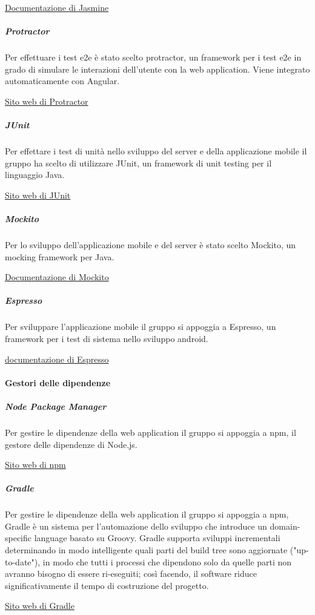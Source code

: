 \documentclass[../../norme-di-progetto.tex]{subfiles}
\begin{document}
\href{https://jasmine.github.io/}{Documentazione di Jasmine}

\subparagraph{Protractor}%
\label{subp:protractor}
Per effettuare i test e2e è stato scelto protractor, un framework per i test e2e in grado di simulare le interazioni dell'utente con la web application.
Viene integrato automaticamente con Angular.

\href{https://www.protractortest.org/}{Sito web di Protractor}

\subparagraph{JUnit}%
\label{subp:junit}
Per effettare i test di unità nello sviluppo del server e della applicazione mobile il gruppo ha scelto di utilizzare JUnit, un framework di unit testing per il linguaggio Java.

\href{https://junit.org/junit4/}{Sito web di JUnit}

\subparagraph{Mockito}%
\label{subp:mockito}
Per lo sviluppo dell'applicazione mobile e del server è stato scelto Mockito, un mocking framework per Java.

\href{https://site.mockito.org/}{Documentazione di Mockito}

\subparagraph{Espresso}%
\label{subp:espresso}
Per sviluppare l'applicazione mobile il gruppo si appoggia a Espresso, un framework per i test di sistema nello sviluppo android.

\href{https://developer.android.com/training/testing/espresso}{documentazione di Espresso}


\paragraph{Gestori delle dipendenze}%
\label{par:gestori_dipendenze}

\subparagraph{Node Package Manager}%
\label{subp:npm}
Per gestire le dipendenze della web application il gruppo si appoggia a npm, il gestore delle dipendenze di Node.js.

\href{https://www.npmjs.com/}{Sito web di npm}

\subparagraph{Gradle}%
\label{subp:gradle}
Per gestire le dipendenze della web application il gruppo si appoggia a npm,
Gradle è un sistema per l'automazione dello sviluppo che introduce un domain-specific language basato su Groovy.
Gradle supporta sviluppi incrementali determinando in modo intelligente quali parti del build tree sono aggiornate ("up-to-date"), in modo che tutti i processi che dipendono solo da quelle parti non avranno bisogno di essere ri-eseguiti; così facendo, il software riduce significativamente il tempo di costruzione del progetto.

\href{https://gradle.org/}{Sito web di Gradle}
\end{document}
